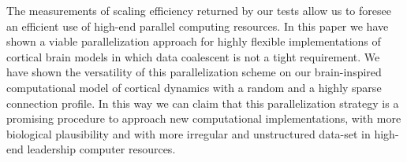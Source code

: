 {The measurements of scaling efficiency returned by our tests allow us to foresee an efficient use of high-end parallel computing resources. In this paper we have shown a viable parallelization approach for highly flexible implementations of cortical brain models in which data coalescent is not a tight requirement. We have shown the versatility of this parallelization scheme on our brain-inspired computational model of cortical dynamics with a random and a highly sparse connection profile. In this way we can claim that this parallelization strategy is a promising procedure to approach new computational implementations, with more biological plausibility and with more irregular and unstructured data-set in high-end leadership computer resources.
}



















